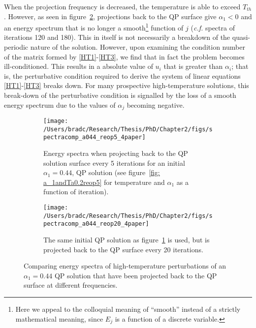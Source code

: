 \documentclass[../PhD.tex]{subfiles}
\begin{document}
When the projection frequency is decreased, the temperature is able to exceed $T_{th}$. However, as seen in figure~\ref{fig: spec comparisons reop20}, projections back to the QP surface give $\alpha_1 < 0$ and an energy spectrum that is no longer a smooth\footnote{Here we appeal to the colloquial meaning of ``smooth'' instead of a strictly mathematical meaning, since $E_j$ is a function of a discrete variable.} function of $j$ ({\it c.f.} spectra of iterations 120 and 180). This in itself is not necessarily a breakdown of the quasi-periodic nature of the solution. However, upon examining the condition number of the matrix formed by \eqref{HT1}-\eqref{HT3}, we find that in fact the problem becomes ill-conditioned. This results in a absolute value of $u_i$ that is greater than $\alpha_i$; that is, the perturbative condition required to derive the system of linear equations \eqref{HT1}-\eqref{HT3} breaks down. For many prospective high-temperature solutions, this break-down of the perturbative condition is signalled by the loss of a smooth energy spectrum due to the values of $\alpha_j$ becoming negative. 

\begin{figure}[H]
	\centering
	\begin{subfigure}[t]{0.47\textwidth}
		\texttt{[image: /Users/bradc/Research/Thesis/PhD/Chapter2/figs/spectracomp\_a044\_reop5\_4paper]}
		\caption{Energy spectra when projecting back to the QP solution surface every 5 iterations for an initial ${\alpha_1 = 0.44}$, QP solution (see figure~\ref{fig: a_1andTa0.2reop5} for temperature and $\alpha_1$ as a function of iteration).}
		\label{fig: spec comparisons reop5}
	\end{subfigure}
	\hfill
	\begin{subfigure}[t]{0.47\textwidth}
		\texttt{[image: /Users/bradc/Research/Thesis/PhD/Chapter2/figs/spectracomp\_a044\_reop20\_4paper]}
		\caption{The same initial QP solution as figure~\ref{fig: spec comparisons reop5} is used, but is projected back to the QP surface every 20 iterations.}
		\label{fig: spec comparisons reop20}
	\end{subfigure}
	\caption[Energy spectra resulting from perturbing the same QP solution at differing frequencies]{Comparing energy spectra of high-temperature perturbations of an $\alpha_1=0.44$ QP solution that have been projected back to the QP surface at different frequencies.}
	\label{fig: spec comps with reop}
\end{figure}
\end{document}
